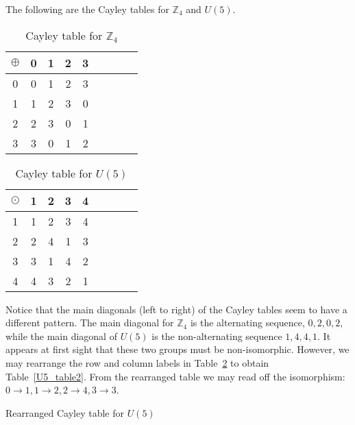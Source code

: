 \begin{example}\label{example:isomorph:Cayley_noniso}
The following are the Cayley tables for ${\mathbb Z}_4$ and $U(5)$.

\begin{table}[H]
\caption{Cayley table for ${\mathbb Z}_4$}
\label{Z4_add_table}
{\small
\begin{center}
\begin{tabular}{c|cccccccc}
$\oplus$ & 0 & 1 & 2 & 3  \\
\hline
0        & 0 & 1 & 2 & 3  \\
1       & 1 & 2 & 3 & 0  \\
2       & 2 & 3 & 0 & 1 \\
3       & 3 & 0 & 1 & 2 \\

\end{tabular}
\end{center}
}
\end{table}

\begin{table}[H]
\caption{Cayley table for $U(5)$\label{U5_table}}
{\small
\begin{center}
\begin{tabular}{c|cccccccc}
$\odot$ & 1 & 2 & 3 & 4  \\
\hline
1        & 1 & 2 & 3 & 4  \\
2       & 2 & 4 & 1 & 3  \\
3       & 3 & 1 & 4 & 2 \\
4       & 4 & 3 & 2 & 1 \\

\end{tabular}
\end{center}
}
\end{table}

Notice that the main diagonals (left to right) of the Cayley tables seem to have a different pattern.  The main diagonal for ${\mathbb Z}_4$ is the alternating sequence, $0, 2, 0, 2$, while the main diagonal of $U(5)$ is the  non-alternating sequence $1, 4, 4, 1$.  It appears at first sight that these two groups must be non-isomorphic.  However, we may rearrange the row and column labels  in Table~\ref{U5_table} to obtain Table~\ref{U5_table2}. From the rearranged table we may read off the isomorphism: $0 \rightarrow 1, 1\rightarrow 2, 2\rightarrow 4, 3 \rightarrow 3$.

\begin{table}[H]
\caption{Rearranged Cayley table for $U(5)$\label{U5_table2}}


\end{table}
\end{example}

